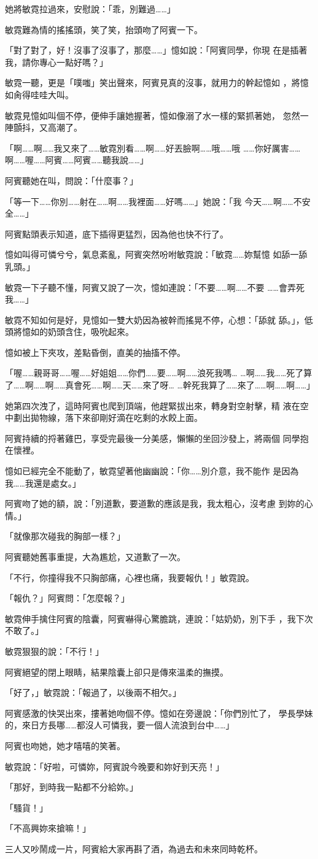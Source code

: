 她將敏霓拉過來，安慰說：「乖，別難過……」

敏霓難為情的搖搖頭，笑了笑，抬頭吻了阿賓一下。

「對了對了，好！沒事了沒事了，那麼……」憶如說：「阿賓同學，你現
在是插著我，請你專心一點好嗎？」

敏霓一聽，更是「噗嗤」笑出聲來，阿賓見真的沒事，就用力的幹起憶如
，將憶如肏得哇哇大叫。

敏霓見憶如叫個不停，便伸手讓她握著，憶如像溺了水一樣的緊抓著她，
忽然一陣顫抖，又高潮了。

「啊……啊……我又來了……敏霓別看……啊……好丟臉啊……哦……哦
……你好厲害……啊……喔……阿賓……阿賓……聽我說……」

阿賓聽她在叫，問說：「什麼事？」

「等一下……你別……射在……啊……我裡面……好嗎……」她說：「我
今天……啊……不安全……」

阿賓點頭表示知道，底下插得更猛烈，因為他也快不行了。

憶如叫得可憐兮兮，氣息紊亂，阿賓突然吩咐敏霓說：「敏霓……妳幫憶
如舔一舔乳頭。」

敏霓一下子聽不懂，阿賓又說了一次，憶如連說：「不要……啊……不要
……會弄死我……」

敏霓不知如何是好，見憶如一雙大奶因為被幹而搖晃不停，心想：「舔就
舔。」，低頭將憶如的奶頭含住，吸吮起來。

憶如被上下夾攻，差點昏倒，直美的抽搐不停。

「喔……親哥哥……喔……好姐姐……你們……要……啊……浪死我嗎…
…啊……我……死了算了……啊……啊……真會死……啊……天……來了呀…
…幹死我算了……來了……啊……啊……」

她第四次洩了，這時阿賓也爬到頂端，他趕緊拔出來，轉身對空射擊，精
液在空中劃出拋物線，落下來卻剛好滴在吃剩的水餃上面。

阿賓持續的捋著雞巴，享受完最後一分美感，懶懶的坐回沙發上，將兩個
同學抱在懷裡。

憶如已經完全不能動了，敏霓望著他幽幽說：「你……別介意，我不能作
是因為我……我還是處女。」

阿賓吻了她的額，說：「別道歉，要道歉的應該是我，我太粗心，沒考慮
到妳的心情。」

「就像那次碰我的胸部一樣？」

阿賓聽她舊事重提，大為尷尬，又道歉了一次。

「不行，你撞得我不只胸部痛，心裡也痛，我要報仇！」敏霓說。

「報仇？」阿賓問：「怎麼報？」

敏霓伸手擒住阿賓的陰囊，阿賓嚇得心驚膽跳，連說：「姑奶奶，別下手
，我下次不敢了。」

敏霓狠狠的說：「不行！」

阿賓絕望的閉上眼睛，結果陰囊上卻只是傳來溫柔的撫摸。

「好了，」敏霓說：「報過了，以後兩不相欠。」

阿賓感激的快哭出來，摟著她吻個不停。憶如在旁邊說：「你們別忙了，
學長學妹的，來日方長哪……都沒人可憐我，要一個人流浪到台中……」

阿賓也吻她，她才嘻嘻的笑著。

敏霓說：「好啦，可憐妳，阿賓說今晚要和妳好到天亮！」

「那好，到時我一點都不分給妳。」

「騷貨！」

「不高興妳來搶嘛！」

三人又吵鬧成一片，阿賓給大家再斟了酒，為過去和未來同時乾杯。










